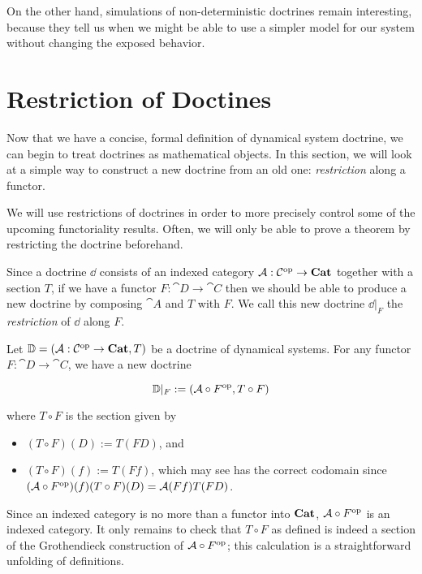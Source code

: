 \documentclass[DynamicalBook]{subfiles}
\begin{document}
On the other hand, simulations of non-deterministic doctrines remain
interesting, because they tell us when we might be able to use a simpler model
for our system without changing the exposed behavior.


\section{Restriction of Doctines}\label{sec.restriction_of_doctrines}

Now that we have a concise, formal definition of dynamical system doctrine, we
can begin to treat doctrines as mathematical objects. In this section, we will
look at a simple way to construct a new doctrine from an old one:
\emph{restriction} along a functor. 

We will use restrictions of doctrines in
order to more precisely control some of the upcoming functoriality results.
Often, we will only be able to prove a theorem by restricting the doctrine beforehand.


Since a doctrine $\dd$ consists of an indexed category $\mathcal{A} : \mathcal{C}^{\textnormal{op}} \to
\textbf{Cat}$ together with a section $T$, if we have a functor $F : \cat{D} \to
\cat{C}$ then we should be able to produce a new doctrine by composing $\cat{A}$
and $T$ with $F$. We call this new doctrine $\dd|_F$ the \emph{restriction} of
$\dd$ along $F$.

\begin{definition}\label{def.restriction_doctrine}
Let $\mathbb{D} = (\mathcal{A} : \mathcal{C}^{\textnormal{op}} \to \textbf{Cat}, T)$ be a doctrine of dynamical
systems. For any functor $F : \cat{D} \to \cat{C}$, we have a new doctrine

$$\mathbb{D}|_F := (\mathcal{A} \circ F^{\textnormal{op}}, T \circ F)$$

where $T \circ F$ is the section given by
\begin{itemize}
  \item $(T \circ F)(D) := T(FD)$, and
  \item $(T \circ F)(f) := T(Ff)$, which may see has the correct codomain since
    $(\mathcal{A} \circ F^{\textnormal{op}})(f)(T \circ F)(D) = \mathcal{A}(Ff)T(FD)$.
\end{itemize}
\end{definition}

Since an indexed category is no more than a functor into $\textbf{Cat}$, $\mathcal{A}
\circ F^{\textnormal{op}}$ is an indexed category. It only remains to check that $T \circ F$ as
defined is indeed a section of the Grothendieck construction of $\mathcal{A} \circ
F^{\textnormal{op}}$; this calculation is a straightforward unfolding of definitions.
\end{document}
